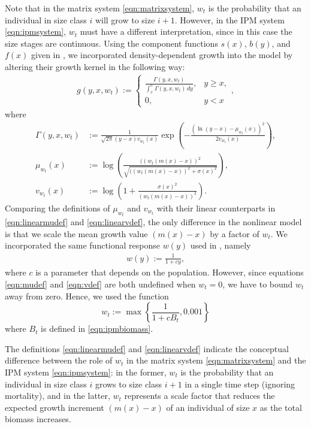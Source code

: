 Note that in the matrix system \eqref{eqn:matrixsystem}, $w_t$ is the probability that an individual in size class $i$ will grow to size $i+1$. However, in the IPM system \eqref{eqn:ipmsystem}, $w_t$ must have a different interpretation, since in this case the size stages are continuous. Using the component functions $s(x)$, $b(y)$, and $f(x)$ given in \cite{Vindenes2014}, we incorporated density-dependent growth into the model by altering their growth kernel in the following way:
\begin{align}
	g(y, x, w_t) := \left\{ \begin{array}{lc} \frac{\Gamma(y, x, w_t)}{\int_x^U \Gamma(y, x, w_t) \, dy}, & y \geq x, \\ 0, & y < x \end{array} \right. ,
\end{align}
where
\begin{align}
	\Gamma(y, x, w_t) &:= \frac{1}{\sqrt{2 \pi}(y - x) v_{w_t}(x)} \exp \left( - \frac{(\ln(y - x) - \mu_{w_t}(x))^2}{2 v_{w_t}(x)} \right), \label{eqn:gammadef}\\
	\mu_{w_t}(x) &:= \log \left( \frac{((w_t(m(x)-x))^2}{\sqrt{((w_t(m(x) - x))^2 + \sigma(x)^2}}\right), \label{eqn:mudef}\\
	v_{w_t}(x) &:= \log \left( 1 + \frac{\sigma(x)^2}{(w_t(m(x)-x))^2}\right).	\label{eqn:vdef}
\end{align}
Comparing the definitions of $\mu_{w_t}$ and $v_{w_t}$ with their linear counterparts in \eqref{eqn:linearmudef} and \eqref{eqn:linearvdef}, the only difference in the nonlinear model is that we scale the mean growth value $(m(x) - x)$ by a factor of $w_t$. We incorporated the same functional response $w(y)$ used in \cite{Callahan2019}, namely 
\begin{align}
	w(y) := \frac{1}{1 + c y}, \label{eqn:wdef}
\end{align}
where $c$ is a parameter that depends on the population. However, since equations \eqref{eqn:mudef} and \eqref{eqn:vdef} are both undefined when $w_t = 0$, we have to bound $w_t$ away from zero. Hence, we used the function
\[w_t := \max \left\{\frac{1}{1 + c B_t}, 0.001 \right\}\]
where $B_t$ is defined in \ref{eqn:ipmbiomass}.

The definitions \eqref{eqn:linearmudef} and \eqref{eqn:linearvdef} indicate the conceptual difference between the role of $w_t$ in the matrix system \eqref{eqn:matrixsystem} and the IPM system \eqref{eqn:ipmsystem}: in the former, $w_t$ is the probability that an individual in size class $i$ grows to size class $i + 1$ in a single time step (ignoring mortality), and in the latter, $w_t$ represents a scale factor that reduces the expected growth increment $(m(x) - x)$ of an individual of size $x$ as the total biomass increases.

